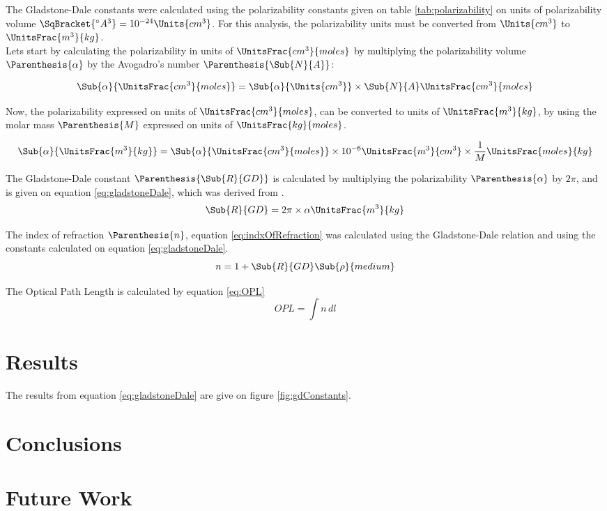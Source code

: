         \indent The Gladstone-Dale constants were calculated using the polarizability constants given on table \ref{tab:polarizability} on units of polarizability volume $\SqBracket{^{\circ}A^3} = 10^{-24}\Units{cm^3}$. For this analysis, the polarizability units must be converted from $\Units{cm^3}$ to $\UnitsFrac{m^3}{kg}$. \\

        \indent Lets start by calculating the polarizability in units of $\UnitsFrac{cm^3}{moles}$ by multiplying the polarizability volume $\Parenthesis{\alpha}$ by the Avogadro's number $\Parenthesis{\Sub{N}{A}}$:

        $$ \Sub{\alpha}{\UnitsFrac{cm^3}{moles}} =  \Sub{\alpha}{\Units{cm^3}} \times \Sub{N}{A} \UnitsFrac{cm^3}{moles} $$

        \indent Now, the polarizability expressed on units of $\UnitsFrac{cm^3}{moles}$, can be converted to units of $\UnitsFrac{m^3}{kg}$, by using the molar mass $\Parenthesis{M}$ expressed on units of $\UnitsFrac{kg}{moles}$.

        $$ \Sub{\alpha}{\UnitsFrac{m^3}{kg}} = \Sub{\alpha}{\UnitsFrac{cm^3}{moles}} \times 10^{-6}\UnitsFrac{m^3}{cm^3} \times \frac{1}{M} \UnitsFrac{moles}{kg} $$

        \indent The Gladstone-Dale constant $\Parenthesis{\Sub{R}{GD}}$ is calculated by multiplying the polarizability $\Parenthesis{\alpha}$ by $2\pi$, and is given on  equation \eqref{eq:gladstoneDale}, which was derived from \cite{mitroy:jop:2010}. 
        \begin{equation}\label{eq:gladstoneDale}
            \Sub{R}{GD} = 2\pi \times \alpha \UnitsFrac{m^3}{kg}
        \end{equation}

        \indent The index of refraction $\Parenthesis{n}$, equation \eqref{eq:indxOfRefraction} was calculated using the Gladstone-Dale relation and using the constants calculated on equation \eqref{eq:gladstoneDale}.
        \begin{equation}\label{eq:indxOfRefraction} 
            n = 1 + \Sub{R}{GD}\Sub{\rho}{medium} 
        \end{equation}

        \indent The Optical Path Length is calculated by equation \eqref{eq:OPL}
        \begin{equation}\label{eq:OPL}
            OPL = \int n\,dl 
        \end{equation} 

    \section{Results}
        \indent The results from equation \eqref{eq:gladstoneDale} are give on figure \ref{fig:gdConstants}. 

    \section{Conclusions} 

    \section{Future Work}

        \newpage 
        \printbibliography[title=Bibliography]


